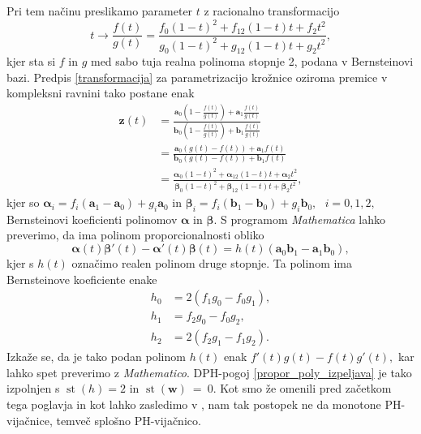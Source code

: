 \documentclass[12pt,a4paper,twoside]{article}
\theoremstyle{definition} %
\theoremstyle{plain} %
\theoremstyle{primerstyle}
\numberwithin{equation}{section}  %
\newcommand{\aV}{\mathbf{a}}
\newcommand{\bV}{\mathbf{b}}
\newcommand{\wV}{\mathbf{w}}
\newcommand{\zV}{\mathbf{z}}
\newcommand{\balpha}{\boldsymbol \alpha}
\newcommand{\bbeta}{\boldsymbol \beta}
\DeclareMathOperator{\st}{st}
\begin{document}
Pri tem načinu preslikamo parameter $t$ z racionalno transformacijo
\begin{equation}
	\label{kvadraticna_reparametrizacija}
	t\to\frac{f(t)}{g(t)}=\frac{f_0(1-t)^2+f_12(1-t)t+f_2t^2}{g_0(1-t)^2+g_12(1-t)t+g_2t^2},
\end{equation}
kjer sta si $f$ in $g$ med sabo tuja realna polinoma stopnje 2, podana v Bernsteinovi bazi. Predpis \eqref{transformacija} za parametrizacijo krožnice oziroma premice v kompleksni ravnini tako postane enak
\begin{align*}
	\zV(t)&=\frac{\aV_0\left(1-\frac{f(t)}{g(t)}\right)+\aV_1\frac{f(t)}{g(t)}}{\bV_0\left(1-\frac{f(t)}{g(t)}\right)+\bV_1\frac{f(t)}{g(t)}}\\
	&=\frac{\aV_0(g(t)-f(t))+\aV_1f(t)}{\bV_0(g(t)-f(t))+\bV_1f(t)}\\
	&=\frac{\balpha_0(1-t)^2+\balpha_12(1-t)t+\balpha_2t^2}{\bbeta_0(1-t)^2+\bbeta_12(1-t)t+\bbeta_2t^2},
\end{align*}
kjer so $\balpha_i=f_i(\aV_1-\aV_0)+g_i\aV_0$ in $\bbeta_i=f_i(\bV_1-\bV_0)+g_i\bV_0,\text{ }i=0,1,2,$ Bernsteinovi koeficienti polinomov $\balpha$ in $\bbeta.$ S programom \emph{Mathematica} lahko preverimo, da ima polinom proporcionalnosti obliko
\begin{equation*}
	\balpha(t)\bbeta'(t)-\balpha'(t)\bbeta(t)=h(t)(\aV_0\bV_1-\aV_1\bV_0),
\end{equation*}
kjer s $h(t)$ označimo realen polinom druge stopnje. Ta polinom ima Bernsteinove koeficiente enake
\begin{align}
	h_0&=2(f_1g_0-f_0g_1),\nonumber\\
	h_1&=f_2g_0-f_0g_2,\label{polinom_h_kvadra_repara}\\
	h_2&=2(f_2g_1-f_1g_2).\nonumber
\end{align}
Izkaže se, da je tako podan polinom $h(t)$ enak $f'(t)g(t)-f(t)g'(t),$ kar lahko spet preverimo z \emph{Mathematico}. DPH-pogoj \eqref{propor_poly_izpeljava} je tako izpolnjen s $\st(h)=2$ in $\st(\wV)~=~0.$ Kot smo že omenili pred začetkom tega poglavja in kot lahko zasledimo v \cite[str.\ 118]{beltranmonterde}, nam tak postopek ne da monotone PH-vijačnice, temveč splošno PH-vijačnico.
\end{document}
